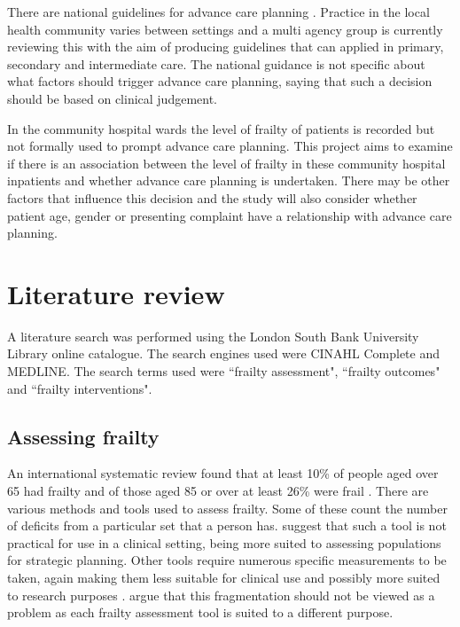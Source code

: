 \documentclass
[
	12pt,
	a4paper,
	oneside,
]{article}
\begin{document}
There are national guidelines for advance care planning \parencite{rcp:09}. 
Practice in the local health community varies between settings and a multi agency 
group is currently reviewing this with the aim of producing guidelines that can 
applied in primary, secondary and intermediate care. The national guidance is not specific
about what factors should trigger advance care planning, saying that such a decision
should be based on clinical judgement.

In the community hospital wards the level of frailty of patients is recorded but 
not formally used to prompt advance
care planning. This project aims to examine if there is an association between the 
level of frailty in these community hospital inpatients and whether advance care planning
is undertaken. There may be other factors that influence this decision and the
study will also consider whether patient age, gender or presenting complaint have 
a relationship with advance care planning.

\section{Literature review}

A literature search was performed using the London South Bank University Library 
online catalogue. The search engines used were CINAHL Complete and MEDLINE. The
search terms used were ``frailty assessment", ``frailty outcomes" and ``frailty 
interventions".

\subsection{Assessing frailty}
An international systematic review found 
that at least 10\% of people aged over 65 had frailty and of those aged 85 or over
at least 26\% were frail \parencite{collard:12}. There are various methods and tools used to assess frailty.
Some of these count the number of deficits from a particular set that a person has. 
\textcite{sternberg:08} suggest that such a tool is not practical for use in a clinical
setting, being more suited to assessing populations for strategic planning. 
Other tools require numerous specific measurements to be taken, again making them
less suitable for clinical use \parencite{martin:08} and possibly more suited to research purposes
\parencite{ensrud:08}. \textcite{romero-ortuno:16} argue that this fragmentation should not
be viewed as a problem as each frailty assessment tool is suited to a different 
purpose. 
\end{document}
